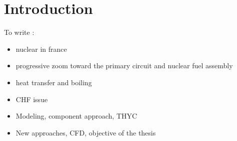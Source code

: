 
\chapter*{Introduction} %

\label{ch:introduction} %


To write :

\begin{itemize}
\item nuclear in france
\item progressive zoom toward the primary circuit and nuclear fuel assembly
\item heat transfer and boiling
\item CHF issue
\item Modeling, component approach, THYC
\item New approaches, CFD, objective of the thesis
\end{itemize}